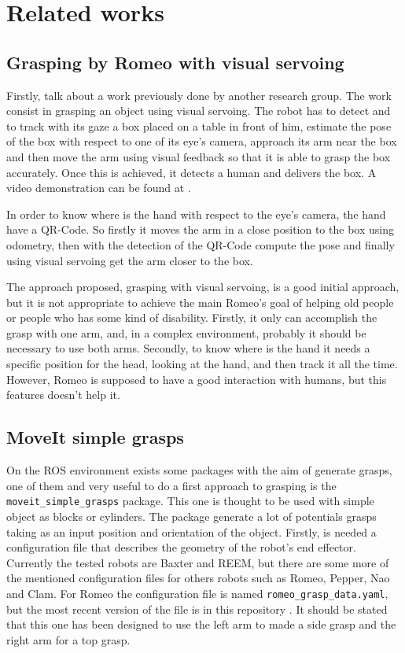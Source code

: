 \documentclass[12pt,a4paper,final,twoside,openright]{report}
\begin{document}
\chapter{Related works}

\section{Grasping by Romeo with visual servoing}
\label{sec:grasping_romeo_visual_servoing}

Firstly, talk about a work previously done by another research group. The work \cite{claudio:hal-01159882} consist in grasping an object using visual servoing. The robot has to detect and to track with its gaze a box placed on a table in front of him, estimate the pose of the box with respect to one of its eye's camera, approach its arm near the box and then move the arm using visual feedback so that it is able to grasp the box accurately. Once this is achieved, it detects a human and delivers the box. A video demonstration can be found at \cite{InriaLagadicgroup}.

In order to know where is the hand with respect to the eye's camera, the hand have a QR-Code. So firstly it moves the arm in a close position to the box using odometry, then with the detection of the QR-Code compute the pose and finally using visual servoing get the arm closer to the box.

The approach proposed, grasping with visual servoing, is a good initial approach, but it is not appropriate to achieve the main Romeo's goal of helping old people or people who has some kind of disability. Firstly, it only can accomplish the grasp with one arm, and, in a complex environment, probably it should be necessary to use both arms. Secondly, to know where is the hand it needs a specific position for the head, looking at the hand, and then track it all the time. However, Romeo is supposed to have a good interaction with humans, but this features doesn't help it.

\section{MoveIt simple grasps}
\label{sec:moveit_simple_grasps}

On the ROS environment exists some packages with the aim of generate grasps, one of them and very useful to do a first approach to grasping is the \texttt{moveit\_simple\_grasps} package. This one is thought to be used with simple object as blocks or cylinders. The package generate a lot of potentials grasps taking as an input position and orientation of the object. Firstly, is needed a configuration file that describes the geometry of the robot's end effector. Currently the tested robots are Baxter and REEM, but there are some more of the mentioned configuration files for others robots such as Romeo, Pepper, Nao and Clam. For Romeo the configuration file is named \texttt{romeo\_grasp\_data.yaml}, but the most recent version of the file is in this repository \cite{gitNlyubovaGrasp}. It should be stated that this one has been designed to use the left arm to made a side grasp and the right arm for a top grasp.
\end{document}
